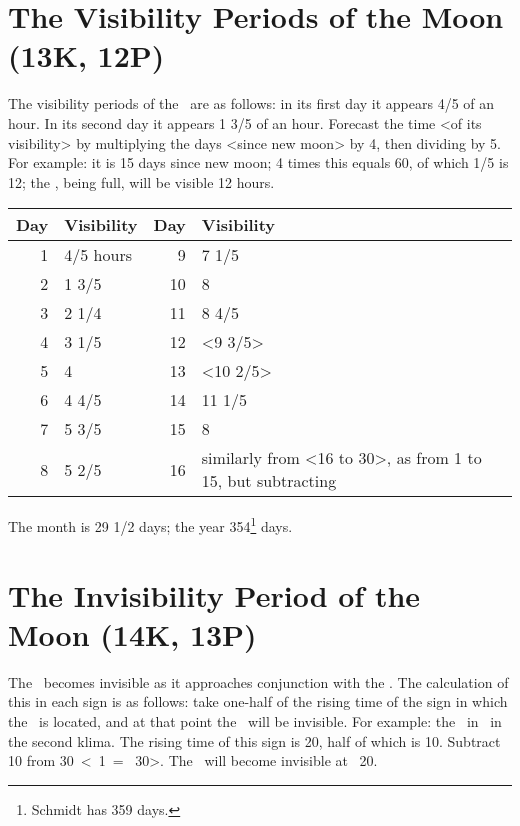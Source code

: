 \section{The Visibility Periods of the Moon (13K, 12P)}
The visibility periods of the \Moon\, are as follows: in its first day it appears 4/5 of an hour. In its second day it appears 1 3/5 of an hour. Forecast the time <of its visibility> by multiplying the days <since new moon> by 4, then dividing by 5. For example: it is 15 days since new moon; 4 times this equals 60, of which 1/5 is 12; the \Moon, being full, will be visible 12 hours.

\begin{table}[ht]
\begin{center}
\begin{tabularx}{\textwidth}	{| r | l | r | X |}
\hline
Day & Visibility & Day & Visibility \\
\hline
1	& 4/5 hours	& 9		& 7 1/5	\\
2	& 1 3/5	  	& 10	& 8			\\	
3	& 2 1/4		& 11	& 8 4/5	\\
4	& 3 1/5		& 12	& <9 3/5>	\\
5	& 4				& 13	& <10 2/5> \\
6	& 4 4/5		& 14	& 11 1/5	\\
7	& 5 3/5		& 15 	& 8			\\
8	& 5 2/5		& 16	& similarly from <16 to 30>, as
							  from 1 to 15, but subtracting \\				\hline
\end{tabularx}
\end{center}
\end{table}

The month is 29 1/2 days; the year 354\footnote{Schmidt has 359 days.} days.

\newpage
\section{The Invisibility Period of the Moon (14K, 13P)}
The \Moon\, becomes invisible as it approaches conjunction with the \Sun. The calculation of this in each sign is as follows: take one-half of the rising time of the sign in which the \Sun\, is located, and at that point the \Moon\, will be invisible. For example: the \Sun\, in \Aries\, in the second klima. The rising time of this sign is 20, half of which is 10. Subtract 10 from 30\deg\, <\Aries\, 1\deg\, = \Pisces\, 30\deg>. The \Moon\, will become invisible at \Pisces\, 20\deg.

